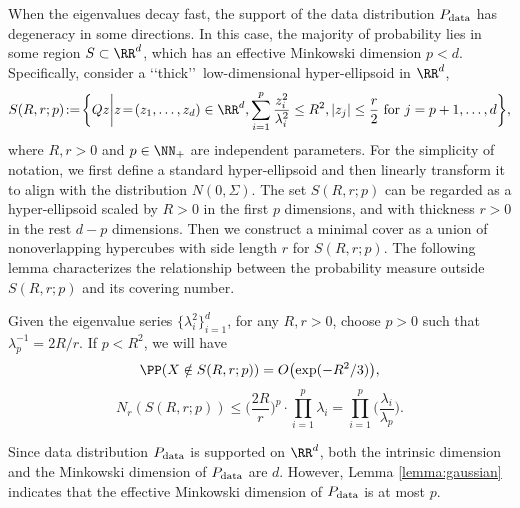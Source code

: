 When the eigenvalues decay fast, the support of the data distribution $P_{\rm data}$ has degeneracy in some directions. In this case, the majority of probability lies in some region $S \subset \RR^d$, which has an effective Minkowski dimension $p<d$. %
Specifically, consider a \lq\lq thick\rq\rq\ low-dimensional hyper-ellipsoid in $\RR^d$, 
\begin{align}
    S(R,r;p)\! :=\! \bigg\{ Qz \bigg| z\!=\!(z_1,\ldots,z_d)\in \RR^d, \sum_{i=1}^p \frac{z_i^2}{\lambda_i^2} \leq R^2, |z_j| \leq \frac{r}{2} \text{ for } j=p+1,\ldots,d  \bigg\}, \label{eq:set}
\end{align}
where $R,r>0$ and $p\in \NN_+$ are independent parameters. For the simplicity of notation, we first define a standard hyper-ellipsoid and then linearly transform it to align with the distribution $N(0,\Sigma)$.  The set $S(R,r;p)$ can be regarded as a hyper-ellipsoid scaled by $R>0$ in the first $p$ dimensions, and  with thickness $r>0$ in the rest $d-p$ dimensions. Then we construct a minimal cover as a union of nonoverlapping hypercubes with side length $r$ for $S(R,r;p)$.
The following lemma characterizes the relationship between the probability measure outside $S(R,r;p)$ and its covering number.

\begin{lemma}\label{lemma:gaussian}
    Given the eigenvalue series $\{\lambda_i^2\}_{i=1}^d$, for any $R,r>0$, choose $p>0$ such that $\lambda_p^{-1} = 2R/r$. If $p< R^2$, we will have
    \begin{equation*}
        \PP(X \notin S(R,r;p) ) =
        O \bigl(\exp( -R^2/3) \bigr),
    \end{equation*}
    \begin{equation*}
      N_r(S(R,r;p)) \leq \biggl(\frac{2R}{r} \biggr)^p \cdot\prod_{i=1}^p \lambda_i= \prod_{i=1}^p \bigg( \frac{\lambda_i}{\lambda_p}\bigg).
    \end{equation*}
\end{lemma}
\begin{remark} 
Since data distribution $P_{\rm data}$ is supported on $\RR^d$, both the intrinsic dimension and the Minkowski dimension of $P_{\rm data}$ are $d$. However, Lemma \ref{lemma:gaussian} indicates that the effective Minkowski dimension of $P_{\rm data}$ is at most $p$. 
\end{remark}

